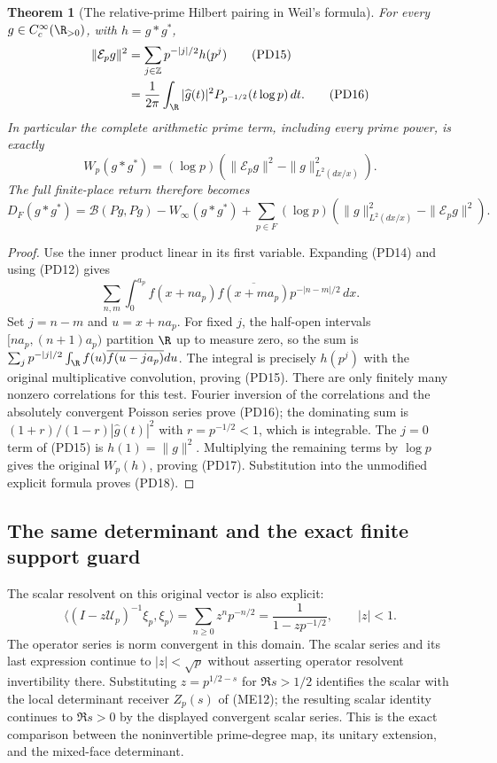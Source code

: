 \documentclass[11pt,a4paper]{article}
\newtheorem{theorem}{Theorem}[section]
\theoremstyle{definition}\newtheorem{definition}[theorem]{Definition}
\newcommand{\Z}{\mathbb Z}\newcommand{\Q}{\mathbb Q}
\begin{document}
\begin{theorem}[The relative-prime Hilbert pairing in Weil's formula]
\label{thm:PD-Weil-energy}
For every $g\in C_c^\infty(\R_{>0})$, with $h=g*g^*$,
\begin{align}
 \|\mathcal E_pg\|^2
 &=\sum_{j\in\Z}p^{-|j|/2}h(p^j)\tag{PD15}\\
 &=\frac1{2\pi}\int_\R|\widehat g(t)|^2
 P_{p^{-1/2}}(t\log p)\,dt.\tag{PD16}
\end{align}
In particular the complete arithmetic prime term, including every prime
power, is exactly
\[
 W_p(g*g^*)=(\log p)
 \left(\|\mathcal E_pg\|^2-\|g\|_{L^2(dx/x)}^2\right).
 \tag{PD17}\label{eq:PD-prime-energy}
\]
The full finite-place return therefore becomes
\[
 D_F(g*g^*)=\mathscr B(Pg,Pg)-W_\infty(g*g^*)
 +\sum_{p\in F}(\log p)
 \left(\|g\|_{L^2(dx/x)}^2-\|\mathcal E_pg\|^2\right).
 \tag{PD18}\label{eq:PD-full-energy}
\]
\end{theorem}
\begin{proof}
Use the inner product linear in its first variable. Expanding (PD14)
and using (PD12) gives
\[
 \sum_{n,m}\int_0^{a_p}
 f(x+n a_p)\overline{f(x+m a_p)}p^{-|n-m|/2}\,dx.
\]
Set $j=n-m$ and $u=x+n a_p$. For fixed $j$, the half-open intervals
$[n a_p,(n+1)a_p)$ partition $\R$ up to measure zero, so the sum is
$\sum_jp^{-|j|/2}\int_\R f(u)\overline{f(u-j a_p)}du$.
The integral is precisely $h(p^j)$ with the original multiplicative
convolution, proving (PD15). There are only finitely many nonzero
correlations for this test. Fourier inversion of the correlations and
the absolutely convergent Poisson series prove (PD16); the dominating
sum is $(1+r)/(1-r)|\widehat g(t)|^2$ with $r=p^{-1/2}<1$,
which is integrable. The $j=0$ term of (PD15) is
$h(1)=\|g\|^2$. Multiplying the remaining terms by $\log p$
gives the original $W_p(h)$, proving (PD17). Substitution into the
unmodified explicit formula proves (PD18).
\end{proof}

\subsection{The same determinant and the exact finite support guard}
The scalar resolvent on this original vector is also explicit:
\[
 \langle (I-z\mathscr U_p)^{-1}\xi_p,\xi_p\rangle
 =\sum_{n\ge0}z^np^{-n/2}=
 \frac1{1-zp^{-1/2}},\qquad |z|<1.
 \tag{PD19}
\]
The operator series is norm convergent in this domain. The scalar series
and its last expression continue to $|z|<\sqrt p$ without asserting
operator resolvent invertibility there. Substituting
$z=p^{1/2-s}$ for $\Re s>1/2$ identifies the scalar with the local
determinant receiver $Z_p(s)$ of (ME12); the resulting scalar identity
continues to $\Re s>0$ by the displayed convergent scalar series.
This is the exact comparison between the noninvertible prime-degree
map, its unitary extension, and the mixed-face determinant.
\end{document}
